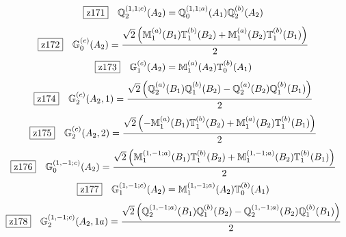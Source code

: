 \documentclass[fleqn,10pt,landscape]{jsarticle}
\begin{document}
\begin{dmath*}
\hspace*{3mm}\fbox{z171}\quad \mathbb{Q}_{2}^{(1,1;c)}(A_{2})=\mathbb{Q}_{0}^{(1,1;a)}(A_{1}) \mathbb{Q}_{2}^{(b)}(A_{2})
\end{dmath*}
\begin{dmath*}
\hspace*{3mm}\fbox{z172}\quad \mathbb{G}_{0}^{(c)}(A_{2})=\frac{\sqrt{2} \left(\mathbb{M}_{1}^{(a)}(B_{1}) \mathbb{T}_{1}^{(b)}(B_{2}) + \mathbb{M}_{1}^{(a)}(B_{2}) \mathbb{T}_{1}^{(b)}(B_{1})\right)}{2}
\end{dmath*}
\begin{dmath*}
\hspace*{3mm}\fbox{z173}\quad \mathbb{G}_{1}^{(c)}(A_{2})=\mathbb{M}_{1}^{(a)}(A_{2}) \mathbb{T}_{0}^{(b)}(A_{1})
\end{dmath*}
\begin{dmath*}
\hspace*{3mm}\fbox{z174}\quad \mathbb{G}_{2}^{(c)}(A_{2},1)=\frac{\sqrt{2} \left(\mathbb{Q}_{2}^{(a)}(B_{1}) \mathbb{Q}_{1}^{(b)}(B_{2}) - \mathbb{Q}_{2}^{(a)}(B_{2}) \mathbb{Q}_{1}^{(b)}(B_{1})\right)}{2}
\end{dmath*}
\begin{dmath*}
\hspace*{3mm}\fbox{z175}\quad \mathbb{G}_{2}^{(c)}(A_{2},2)=\frac{\sqrt{2} \left(- \mathbb{M}_{1}^{(a)}(B_{1}) \mathbb{T}_{1}^{(b)}(B_{2}) + \mathbb{M}_{1}^{(a)}(B_{2}) \mathbb{T}_{1}^{(b)}(B_{1})\right)}{2}
\end{dmath*}
\begin{dmath*}
\hspace*{3mm}\fbox{z176}\quad \mathbb{G}_{0}^{(1,-1;c)}(A_{2})=\frac{\sqrt{2} \left(\mathbb{M}_{1}^{(1,-1;a)}(B_{1}) \mathbb{T}_{1}^{(b)}(B_{2}) + \mathbb{M}_{1}^{(1,-1;a)}(B_{2}) \mathbb{T}_{1}^{(b)}(B_{1})\right)}{2}
\end{dmath*}
\begin{dmath*}
\hspace*{3mm}\fbox{z177}\quad \mathbb{G}_{1}^{(1,-1;c)}(A_{2})=\mathbb{M}_{1}^{(1,-1;a)}(A_{2}) \mathbb{T}_{0}^{(b)}(A_{1})
\end{dmath*}
\begin{dmath*}
\hspace*{3mm}\fbox{z178}\quad \mathbb{G}_{2}^{(1,-1;c)}(A_{2},1a)=\frac{\sqrt{2} \left(\mathbb{Q}_{2}^{(1,-1;a)}(B_{1}) \mathbb{Q}_{1}^{(b)}(B_{2}) - \mathbb{Q}_{2}^{(1,-1;a)}(B_{2}) \mathbb{Q}_{1}^{(b)}(B_{1})\right)}{2}
\end{dmath*}
\end{document}
